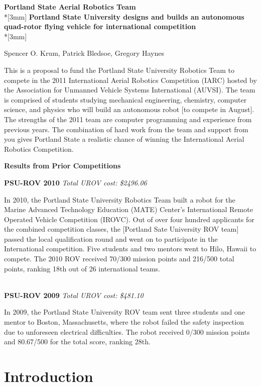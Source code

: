 \documentclass{article}
\begin{document}
\begin{center}
{\Large{\bf Portland State Aerial Robotics Team}}\\*[3mm]
{\bf Portland State University designs and builds an autonomous quad-rotor flying vehicle for international competition} \\*[3mm]

Spencer O. Krum, Patrick Bledsoe, Gregory Haynes

\end{center}


This is a  proposal to fund the Portland State University Robotics Team to compete in the 2011 International Aerial Robotics Competition (IARC) hosted by the Association for Unmanned Vehicle Systems International (AUVSI). The team is comprised of students studying mechanical engineering,
 chemistry, computer science, and physics who will build an autonomous robot [to compete in August].  The strengths of the 2011 team are computer programming and experience from previous years. The combination of hard work 
from the team and support from you gives Portland State a realistic chance of winning the International Aerial Robotics Competition.  


\centerline{\bf Results from Prior Competitions}

\noindent
{\bf PSU-ROV 2010}
{\it Total UROV cost: \$2496.06}

In 2010, the Portland State University Robotics Team built a robot for the Marine Advanced Technology Education (MATE) Center's International Remote Operated Vehicle Competition (IROVC). Out of over four hundred applicants for the combined competition classes, the [Portland Sate University ROV team] passed the local qualification round and went on to participate in the International competition. 
Five students and two mentors went to Hilo, Hawaii to compete. The 2010 ROV received 70/300 mission points and 216/500 total points, 
ranking 18th out of 26 international teams.

\ \\
\noindent
{\bf PSU-ROV 2009}
{\it Total UROV cost: \$481.10}

In 2009, the Portland State University ROV team sent three students and one mentor to Boston, Massachusetts, where the robot failed the safety inspection 
due to unforeseen electrical difficulties.  The robot received 0/300 mission points and 80.67/500 for the total score, ranking 28th. 


\section{Introduction}
\end{document}
